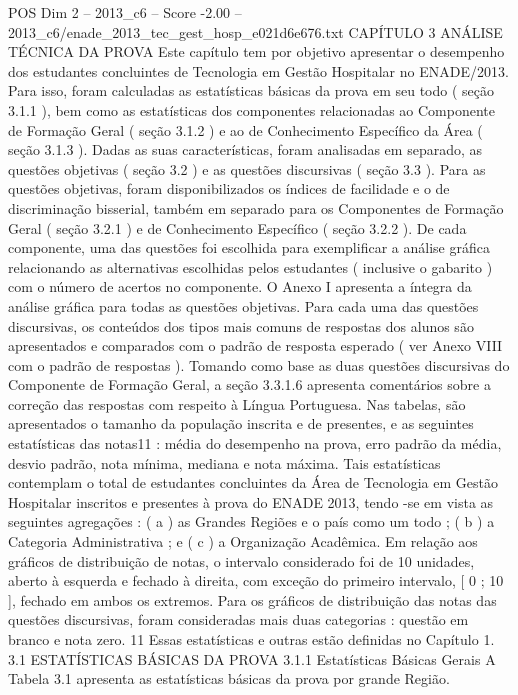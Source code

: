 \begin{textsample}{POS Dim 2 – 2013\_c6 – Score -2.00 – 2013\_c6/enade\_2013\_tec\_gest\_hosp\_e021d6e676.txt}  \label{ex:f2_pos_383}
CAPÍTULO 3 ANÁLISE TÉCNICA DA PROVA Este capítulo tem por objetivo apresentar o desempenho dos estudantes concluintes de Tecnologia em Gestão Hospitalar no ENADE/2013.
Para isso, foram calculadas as estatísticas básicas da prova em seu todo ( seção 3.1.1 ), bem como as estatísticas dos componentes relacionadas ao Componente de Formação Geral ( seção 3.1.2 ) e ao de Conhecimento Específico da Área ( seção 3.1.3 ).
Dadas as suas características, foram analisadas em separado, as questões objetivas ( seção 3.2 ) e as questões discursivas ( seção 3.3 ).
Para as questões objetivas, foram disponibilizados os índices de facilidade e o de discriminação bisserial, também em separado para os Componentes de Formação Geral ( seção 3.2.1 ) e de Conhecimento Específico ( seção 3.2.2 ).
De cada componente, uma das questões foi escolhida para exemplificar a análise gráfica relacionando as alternativas escolhidas pelos estudantes ( inclusive o gabarito ) com o número de acertos no componente.
O Anexo I apresenta a íntegra da análise gráfica para todas as questões objetivas.
Para cada uma das questões discursivas, os conteúdos dos tipos mais comuns de respostas dos alunos são apresentados e comparados com o padrão de resposta esperado ( ver Anexo VIII com o padrão de respostas ).
Tomando como base as duas questões discursivas do Componente de Formação Geral, a seção 3.3.1.6 apresenta comentários sobre a correção das respostas com respeito à Língua Portuguesa.
Nas tabelas, são apresentados o tamanho da população inscrita e de presentes, e as seguintes estatísticas das notas11 : média do desempenho na prova, erro padrão da média, desvio padrão, nota mínima, mediana e nota máxima.
Tais estatísticas contemplam o total de estudantes concluintes da Área de Tecnologia em Gestão Hospitalar inscritos e presentes à prova do ENADE 2013, tendo -se em vista as seguintes agregações : ( a ) as Grandes Regiões e o país como um todo ; ( b ) a Categoria Administrativa ; e ( c ) a Organização Acadêmica.
Em relação aos gráficos de distribuição de notas, o intervalo considerado foi de 10 unidades, aberto à esquerda e fechado à direita, com exceção do primeiro intervalo, [ 0 ; 10 ], fechado em ambos os extremos.
Para os gráficos de distribuição das notas das questões discursivas, foram consideradas mais duas categorias : questão em branco e nota zero. 11 Essas estatísticas e outras estão definidas no Capítulo 1. 3.1 ESTATÍSTICAS BÁSICAS DA PROVA 3.1.1 Estatísticas Básicas Gerais A Tabela 3.1 apresenta as estatísticas básicas da prova por grande Região.

\end{textsample}
